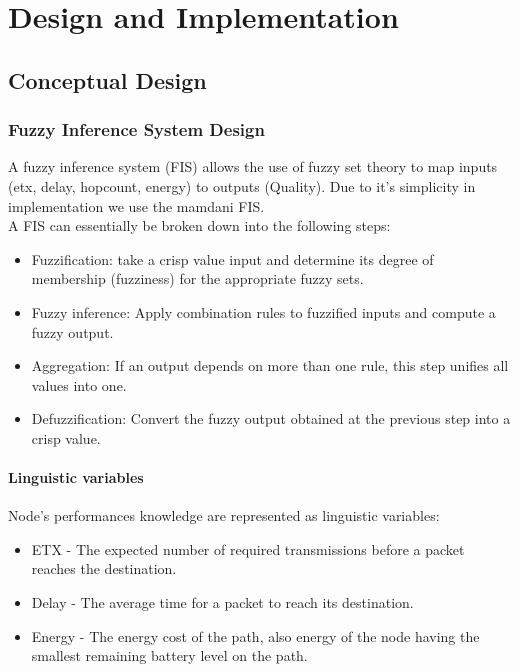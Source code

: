 \chapter{Design and Implementation} \label{Design andImplementation}
\section{Conceptual Design} \label{Conceptual Design}
\subsection{Fuzzy Inference System Design} \label{Fuzzy Inference System Design}
A fuzzy inference system (FIS) allows the use of fuzzy set theory to map inputs (etx, delay, hopcount, energy) to outputs (Quality). Due to it's simplicity in implementation we use the mamdani FIS.\\
\noindent A FIS can essentially be broken down into the following steps:\\
\vspace{-1cm}
\begin{itemize}
\item Fuzzification: take a crisp value input and determine its degree of membership (fuzziness) for the appropriate fuzzy sets.
\item Fuzzy inference: Apply combination rules to fuzzified inputs and compute a fuzzy output.
\item Aggregation: If an output depends on more than one rule, this step unifies all values into one.
\item Defuzzification: Convert the fuzzy output obtained at the previous step into a crisp value.
\end{itemize}
\subsubsection{Linguistic variables}
\noindent Node’s performances knowledge are represented as linguistic variables:\\
\vspace{-1cm}
\begin{itemize}
\item ETX - The expected number of required transmissions before a packet reaches the destination.
\item Delay - The average time for a packet to reach its destination.
\item Energy - The energy cost of the path, also energy of the node having the smallest remaining battery level on the path.
\end{itemize}
